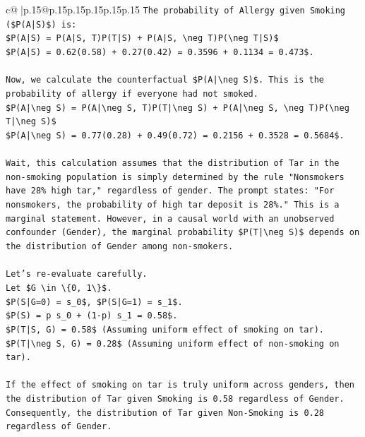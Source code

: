 \documentclass{article}
\begin{document}
{\begin{supertabular}{c@{$\;$}|p{.15\linewidth}@{}p{.15\linewidth}p{.15\linewidth}p{.15\linewidth}p{.15\linewidth}p{.15\linewidth}}
{{{\texttt{The probability of Allergy given Smoking (\$P(A|S)\$) is:} \\
\texttt{\$P(A|S) = P(A|S, T)P(T|S) + P(A|S, \textbackslash{}neg T)P(\textbackslash{}neg T|S)\$} \\
\texttt{\$P(A|S) = 0.62(0.58) + 0.27(0.42) = 0.3596 + 0.1134 = 0.473\$.} \\
\\ 
\texttt{Now, we calculate the counterfactual \$P(A|\textbackslash{}neg S)\$. This is the probability of allergy if everyone had not smoked.} \\
\texttt{\$P(A|\textbackslash{}neg S) = P(A|\textbackslash{}neg S, T)P(T|\textbackslash{}neg S) + P(A|\textbackslash{}neg S, \textbackslash{}neg T)P(\textbackslash{}neg T|\textbackslash{}neg S)\$} \\
\texttt{\$P(A|\textbackslash{}neg S) = 0.77(0.28) + 0.49(0.72) = 0.2156 + 0.3528 = 0.5684\$.} \\
\\ 
\texttt{Wait, this calculation assumes that the distribution of Tar in the non{-}smoking population is simply determined by the rule "Nonsmokers have 28\% high tar," regardless of gender. The prompt states: "For nonsmokers, the probability of high tar deposit is 28\%." This is a marginal statement. However, in a causal world with an unobserved confounder (Gender), the marginal probability \$P(T|\textbackslash{}neg S)\$ depends on the distribution of Gender among non{-}smokers.} \\
\\ 
\texttt{Let's re{-}evaluate carefully.} \\
\texttt{Let \$G \textbackslash{}in \textbackslash{}\{0, 1\textbackslash{}\}\$.} \\
\texttt{\$P(S|G=0) = s\_0\$, \$P(S|G=1) = s\_1\$.} \\
\texttt{\$P(S) = p s\_0 + (1{-}p) s\_1 = 0.58\$.} \\
\texttt{\$P(T|S, G) = 0.58\$ (Assuming uniform effect of smoking on tar).} \\
\texttt{\$P(T|\textbackslash{}neg S, G) = 0.28\$ (Assuming uniform effect of non{-}smoking on tar).} \\
\\ 
\texttt{If the effect of smoking on tar is truly uniform across genders, then the distribution of Tar given Smoking is 0.58 regardless of Gender.} \\
\texttt{Consequently, the distribution of Tar given Non{-}Smoking is 0.28 regardless of Gender.} \\
}}}
\end{supertabular}}
\end{document}
